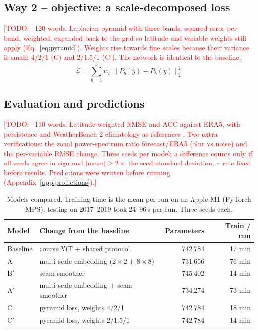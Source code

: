 \documentclass{article}
\newcommand{\todo}[1]{\textcolor{red}{[TODO: #1]}}
\begin{document}
\subsection{Way 2 -- objective: a scale-decomposed loss}
\todo{~120 words. Laplacian pyramid \cite{burt1983laplacian} with three bands; squared error per band, weighted, expanded back to the grid so latitude and variable weights still apply (Eq.~\ref{eq:pyramid}). Weights rise towards fine scales because their variance is small: 4/2/1 (C) and 2/1.5/1 (C$'$). The network is identical to the baseline.}
\begin{equation}
  \mathcal{L} = \sum_{b=1}^{3} w_b \, \big\lVert P_b(\hat{y}) - P_b(y) \big\rVert_2^2
  \label{eq:pyramid}
\end{equation}

\subsection{Evaluation and predictions}
\todo{~110 words. Latitude-weighted RMSE and ACC against ERA5, with persistence and WeatherBench 2 climatology as references \cite{rasp2024weatherbench2}. Two extra verifications: the zonal power-spectrum ratio forecast/ERA5 (blur vs noise) and the per-variable RMSE change. Three seeds per model; a difference counts only if all seeds agree in sign and $|\text{mean}| \geq 2\times$ the seed standard deviation, a rule fixed before results. Predictions were written before running (Appendix~\ref{app:predictions}).}

\begin{table}[t]
  \caption{Models compared. Training time is the mean per run on an Apple M1 (PyTorch MPS); testing on 2017--2019 took 24--96\,s per run. Three seeds each.}
  \label{tab:models}
  \centering
  \small
  \begin{tabular}{llrr}
    \toprule
    Model & Change from the baseline & Parameters & Train / run \\
    \midrule
    Baseline & course ViT + shared protocol & 742,784 & 17 min \\
    A        & multi-scale embedding ($2\times2$ + $8\times8$) & 731,656 & 76 min \\
    B$'$     & seam smoother & 745,402 & 14 min \\
    A$'$     & multi-scale embedding + seam smoother & 734,274 & 73 min \\
    C        & pyramid loss, weights 4/2/1 & 742,784 & 18 min \\
    C$'$     & pyramid loss, weights 2/1.5/1 & 742,784 & 14 min \\
    \bottomrule
  \end{tabular}
\end{table}
\end{document}
